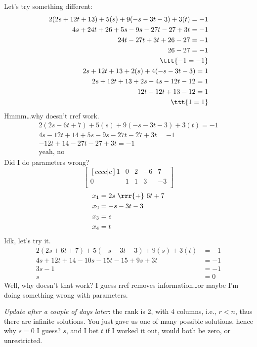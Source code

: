 \documentclass[basic]{inVerba-notes}
\begin{document}
\begin{enumerate}
Let's try something different:
\begin{align*}
  2(2s + 12t + 13) + 5(s) + 9(-s -3t -3) + 3(t) = -1 \\
  4s + 24t + 26 + 5s - 9s - 27t - 27 + 3t = -1 \\
  24t - 27t+ 3t + 26 -27  = - 1 \\ 
  26 - 27 = -1 \\
  \ttt{-1 = -1} \\
  2s + 12t + 13 + 2(s) + 4(-s -3t - 3) = 1 \\
  2s + 12t + 13 + 2s - 4s -12t - 12 = 1 \\
  12t - 12t + 13 - 12 = 1 \\
  \ttt{1 = 1}
\end{align*}
Hmmm\dots why doesn't rref work.
\begin{align*}
  2(2s - 6t + 7) + 5(s) + 9 (-s -3t -3) + 3(t) = - 1 \\
  4s - 12t + 14 + 5s - 9s - 27t - 27 + 3t = - 1 \\
  -12t + 14 - 27t -27 + 3t = -1 \\
  \text{yeah, no}  
\end{align*}
Did I do parameters wrong?
\[%
\begin{bmatrix}[cccc|c]
  1 & 0 & 2 & -6 & 7 \\
  0 & 1 & 1 & 3 & -3 \\
\end{bmatrix}
\]%
\begin{align*}
  x_1 &= 2s~\rrr{+}~6t + 7 \\
  x_2 &= -s -3t - 3 \\
  x_3 &= s \\
  x_4 &= t
\end{align*}
Idk, let's try it.
\begin{align*}
  2(2s + 6t + 7) + 5(-s -3t -3) + 9(s) + 3(t) &= -1 \\
  4s + 12t + 14 -10s -15t - 15 + 9s + 3t &= -1 \\
  3s - 1 &= -1 \\ 
  s &= 0
\end{align*}
Well, why doesn't that work? I guess rref removes information\dots or maybe I'm doing something wrong with parameters.

\emph{Update after a couple of days later}: the rank is 2, with 4 columns, i.e., \(r < n\), thus there are infinite solutions. You just gave us one of many possible solutions, hence why \(s=0\) I guess? \(s\), and I bet \(t\) if I worked it out, would both be zero, or unrestricted.
\end{enumerate}
\end{document}
